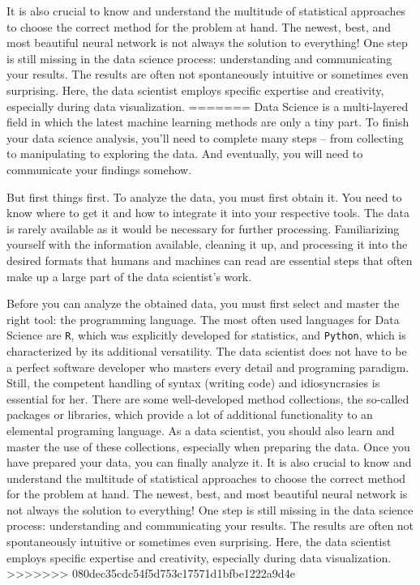 \documentclass[
  11pt,
]{article}
\begin{document}
It is also crucial to know and understand the multitude of statistical approaches to choose the correct method for the problem at hand.
The newest, best, and most beautiful neural network is not always the solution to everything!
One step is still missing in the data science process: understanding and communicating your results.
The results are often not spontaneously intuitive or sometimes even surprising.
Here, the data scientist employs specific expertise and creativity, especially during data visualization.
=======
Data Science is a multi-layered field in which the latest machine learning methods are only a tiny part. To finish your data science analysis, you'll need to complete many steps -- from collecting to manipulating to exploring the data. And eventually, you will need to communicate your findings somehow.

But first things first. To analyze the data, you must first obtain it. You need to know where to get it and how to integrate it into your respective tools. The data is rarely available as it would be necessary for further processing. Familiarizing yourself with the information available, cleaning it up, and processing it into the desired formats that humans and machines can read are essential steps that often make up a large part of the data scientist's work.

Before you can analyze the obtained data, you must first select and master the right tool: the programming language. The most often used languages for Data Science are \texttt{R}, which was explicitly developed for statistics, and \texttt{Python}, which is characterized by its additional versatility. The data scientist does not have to be a perfect software developer who masters every detail and programing paradigm. Still, the competent handling of syntax (writing code) and idiosyncrasies is essential for her.
There are some well-developed method collections, the so-called packages or libraries, which provide a lot of additional functionality to an elemental programing language. As a data scientist, you should also learn and master the use of these collections, especially when preparing the data.
Once you have prepared your data, you can finally analyze it. It is also crucial to know and understand the multitude of statistical approaches to choose the correct method for the problem at hand. The newest, best, and most beautiful neural network is not always the solution to everything!
One step is still missing in the data science process: understanding and communicating your results. The results are often not spontaneously intuitive or sometimes even surprising. Here, the data scientist employs specific expertise and creativity, especially during data visualization.
>>>>>>> 080dec35cdc54f5d753c17571d1bfbe1222a9d4e
\end{document}

